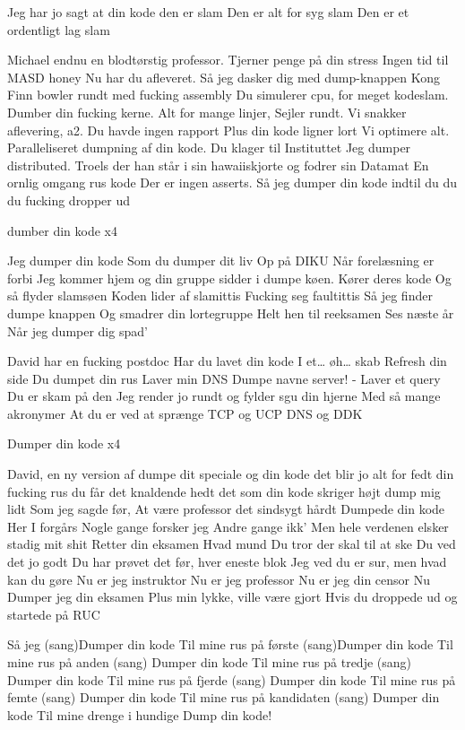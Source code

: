 \documentclass[a4paper,11pt]{article}
\begin{document}
\begin{song}

%
Jeg har jo sagt at din kode den er slam
Den er alt for syg slam
Den er et ordentligt lag slam

%
Michael endnu en blodtørstig professor.
Tjerner penge på din stress
Ingen tid til MASD honey
Nu har du afleveret.
Så jeg dasker dig med dump-knappen
Kong Finn bowler rundt med fucking assembly
Du simulerer cpu, for meget kodeslam.
Dumber din fucking kerne.
Alt for mange linjer,
Sejler rundt.
Vi snakker aflevering, a2.
Du havde ingen rapport
Plus din kode ligner lort
Vi optimere alt.
Paralleliseret dumpning af din kode.
Du klager til Instituttet
Jeg dumper distributed.
Troels der han står i sin hawaiiskjorte
og fodrer sin Datamat
En ornlig omgang rus kode
Der er ingen asserts.
Så jeg dumper din kode
indtil du du du
fucking dropper ud

%
dumber din kode x4

%
Jeg dumper din kode
Som du dumper dit liv
Op på DIKU
Når forelæsning er forbi
Jeg kommer hjem
og din gruppe sidder i dumpe køen.
Kører deres kode
Og så flyder slamsøen
Koden lider af slamittis
Fucking seg faultittis
Så jeg finder
dumpe knappen
Og smadrer din lortegruppe
Helt hen til reeksamen
Ses næste år
Når jeg dumper dig spad'

%
David har en fucking postdoc
Har du lavet din kode
I et… øh… skab
Refresh din side
Du dumpet din rus
Laver min DNS
Dumpe navne server! -
Laver et query
Du er skam på den
Jeg render jo rundt og fylder sgu din hjerne
Med så mange akronymer
At du er ved at sprænge
TCP og UCP
DNS og DDK

%
Dumper din kode x4

%
David, en ny version af dumpe dit
speciale og din kode 
det blir jo alt for fedt
din fucking rus
du får det knaldende hedt 
det som din kode skriger højt
dump mig lidt
Som jeg sagde før,
At være professor det sindsygt hårdt
Dumpede din kode
Her I forgårs
Nogle gange forsker jeg
Andre gange ikk’
Men hele verdenen elsker stadig mit shit
Retter din eksamen
Hvad mund
Du tror der skal til at ske
Du ved det jo godt
Du har prøvet det før, hver eneste blok
Jeg ved du er sur, 
men hvad kan du gøre
Nu er jeg instruktor
Nu er jeg professor
Nu er jeg din censor
Nu Dumper jeg din eksamen
Plus min lykke, ville være gjort
Hvis du droppede ud og startede på RUC


%
Så jeg
(sang)Dumper din kode
Til mine rus på første
(sang)Dumper din kode
Til mine rus på anden
(sang) Dumper din kode
Til mine rus på tredje
(sang) Dumper din kode
Til mine rus på fjerde
(sang) Dumper din kode
Til mine rus på femte
(sang) Dumper din kode
Til mine rus på kandidaten
(sang) Dumper din kode
Til mine drenge i hundige
Dump din kode!


\end{song}
\end{document}
